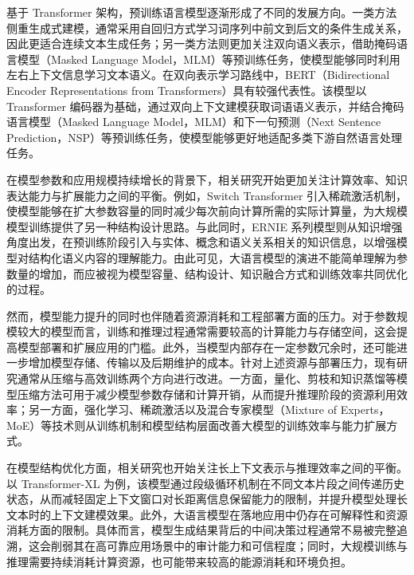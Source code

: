 基于 Transformer 架构，预训练语言模型逐渐形成了不同的发展方向。一类方法侧重生成式建模，通常采用自回归方式学习词序列中前文到后文的条件生成关系，因此更适合连续文本生成任务；另一类方法则更加关注双向语义表示，借助掩码语言模型（Masked Language Model，MLM）等预训练任务，使模型能够同时利用左右上下文信息学习文本语义。在双向表示学习路线中，BERT（Bidirectional Encoder Representations from Transformers）具有较强代表性。该模型以 Transformer 编码器为基础，通过双向上下文建模获取词语语义表示，并结合掩码语言模型（Masked Language Model，MLM）和下一句预测（Next Sentence Prediction，NSP）等预训练任务，使模型能够更好地适配多类下游自然语言处理任务\cite{Devlin2019BERT}。

在模型参数和应用规模持续增长的背景下，相关研究开始更加关注计算效率、知识表达能力与扩展能力之间的平衡。例如，Switch Transformer 引入稀疏激活机制，使模型能够在扩大参数容量的同时减少每次前向计算所需的实际计算量，为大规模模型训练提供了另一种结构设计思路\cite{Fedus2022SwitchTransformers}。与此同时，ERNIE 系列模型则从知识增强角度出发，在预训练阶段引入与实体、概念和语义关系相关的知识信息，以增强模型对结构化语义内容的理解能力\cite{Zhang2019ERNIE}。由此可见，大语言模型的演进不能简单理解为参数量的增加，而应被视为模型容量、结构设计、知识融合方式和训练效率共同优化的过程。

然而，模型能力提升的同时也伴随着资源消耗和工程部署方面的压力。对于参数规模较大的模型而言，训练和推理过程通常需要较高的计算能力与存储空间，这会提高模型部署和扩展应用的门槛\cite{Zhao2023SurveyLargeLanguageModels}。此外，当模型内部存在一定参数冗余时，还可能进一步增加模型存储、传输以及后期维护的成本。针对上述资源与部署压力，现有研究通常从压缩与高效训练两个方向进行改进。一方面，量化、剪枝和知识蒸馏等模型压缩方法可用于减少模型参数存储和计算开销，从而提升推理阶段的资源利用效率\cite{Han2015DeepCompression,Hinton2015KnowledgeDistillation}；另一方面，强化学习、稀疏激活以及混合专家模型（Mixture of Experts，MoE）等技术则从训练机制和模型结构层面改善大模型的训练效率与能力扩展方式\cite{Guo2025DeepSeekR1}。

在模型结构优化方面，相关研究也开始关注长上下文表示与推理效率之间的平衡。以 Transformer-XL 为例，该模型通过段级循环机制在不同文本片段之间传递历史状态，从而减轻固定上下文窗口对长距离信息保留能力的限制，并提升模型处理长文本时的上下文建模效果\cite{Dai2019TransformerXL}。此外，大语言模型在落地应用中仍存在可解释性和资源消耗方面的限制。具体而言，模型生成结果背后的中间决策过程通常不易被完整追溯，这会削弱其在高可靠应用场景中的审计能力和可信程度；同时，大规模训练与推理需要持续消耗计算资源，也可能带来较高的能源消耗和环境负担\cite{Zhao2024ExplainabilityLLMSurvey,Yu2024EnvironmentalImpactAI}。

